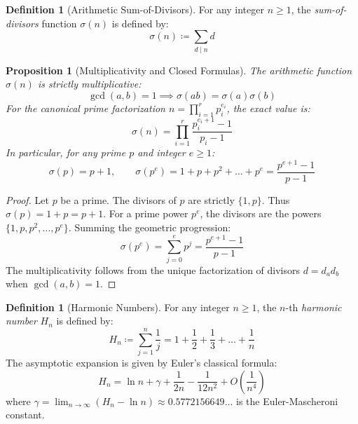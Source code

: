\documentclass[11pt,a4paper]{article}
\newtheorem{proposition}[theorem]{Proposition}
\theoremstyle{definition}
\newtheorem{definition}[theorem]{Definition}
\begin{document}
\begin{definition}[Arithmetic Sum-of-Divisors]\label{def:sigma}
For any integer $n \ge 1$, the \emph{sum-of-divisors} function $\sigma(n)$ is defined by:
\begin{equation}\label{eq:sigma_def}
\sigma(n) \coloneqq \sum_{d \mid n} d
\end{equation}
\end{definition}

\begin{proposition}[Multiplicativity and Closed Formulas]\label{prop:sigma_props}
The arithmetic function $\sigma(n)$ is strictly multiplicative:
\[ \gcd(a, b) = 1 \implies \sigma(a b) = \sigma(a) \sigma(b) \]
For the canonical prime factorization $n = \prod_{i=1}^r p_i^{e_i}$, the exact value is:
\begin{equation}\label{eq:sigma_prod}
\sigma(n) = \prod_{i=1}^r \frac{p_i^{e_i + 1} - 1}{p_i - 1}
\end{equation}
In particular, for any prime $p$ and integer $e \ge 1$:
\begin{equation}\label{eq:sigma_prime}
\sigma(p) = p + 1, \qquad \sigma(p^e) = 1 + p + p^2 + \dots + p^e = \frac{p^{e+1} - 1}{p - 1}
\end{equation}
\end{proposition}

\begin{proof}
Let $p$ be a prime. The divisors of $p$ are strictly $\{1, p\}$. Thus $\sigma(p) = 1 + p = p + 1$.
For a prime power $p^e$, the divisors are the powers $\{1, p, p^2, \dots, p^e\}$.
Summing the geometric progression:
\[ \sigma(p^e) = \sum_{j=0}^e p^j = \frac{p^{e+1} - 1}{p - 1} \]
The multiplicativity follows from the unique factorization of divisors $d = d_a d_b$ when $\gcd(a, b) = 1$.
\end{proof}

\begin{definition}[Harmonic Numbers]\label{def:harmonic}
For any integer $n \ge 1$, the $n$-th \emph{harmonic number} $H_n$ is defined by:
\begin{equation}\label{eq:hn_def}
H_n \coloneqq \sum_{j=1}^n \frac{1}{j} = 1 + \frac{1}{2} + \frac{1}{3} + \dots + \frac{1}{n}
\end{equation}
The asymptotic expansion is given by Euler's classical formula:
\begin{equation}\label{eq:hn_asymp}
H_n = \ln n + \gamma + \frac{1}{2n} - \frac{1}{12n^2} + O\left(\frac{1}{n^4}\right)
\end{equation}
where $\gamma = \lim_{n \to \infty} (H_n - \ln n) \approx 0.5772156649\dots$ is the Euler-Mascheroni constant.
\end{definition}
\end{document}
